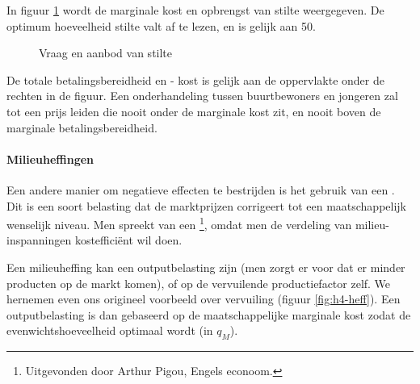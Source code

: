In figuur \ref{fig:h4-eigrec} wordt de marginale kost en opbrengst van stilte weergegeven. De optimum hoeveelheid stilte valt af te lezen, en is gelijk aan 50.

\begin{figure}[H]
\centering
\captionsetup{justification=centering,margin=2cm}
\caption{Vraag en aanbod van stilte}
\label{fig:h4-eigrec}
\end{figure}

De totale betalingsbereidheid en - kost is gelijk aan de oppervlakte onder de rechten in de figuur. Een onderhandeling tussen buurtbewoners en jongeren zal tot een prijs leiden die nooit onder de marginale kost zit, en nooit boven de marginale betalingsbereidheid.

\paragraph{Milieuheffingen}

Een andere manier om negatieve effecten te bestrijden is het gebruik van een . Dit is een soort belasting dat de marktprijzen corrigeert tot een maatschappelijk wenselijk niveau. Men spreekt van een \footnote{Uitgevonden door Arthur Pigou, Engels econoom.}, omdat men de verdeling van milieu-inspanningen kosteffici\"ent wil doen.\\

\par Een milieuheffing kan een outputbelasting zijn (men zorgt er voor dat er minder producten op de markt komen), of op de vervuilende productiefactor zelf. We hernemen even ons origineel voorbeeld over vervuiling (figuur \ref{fig:h4-heff}). Een outputbelasting is dan gebaseerd op de maatschappelijke marginale kost zodat de evenwichtshoeveelheid optimaal wordt (in $q_M$).

